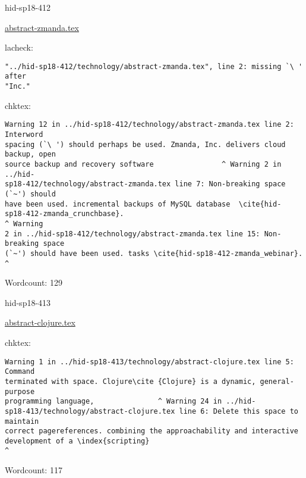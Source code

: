 

\begin{IU}

hid-sp18-412

\href{https://github.com/cloudmesh-community/hid-sp18-412/blob/master//technology/abstract-zmanda.tex}{abstract-zmanda.tex}

 
lacheck:
\begin{tiny}
\begin{verbatim}
"../hid-sp18-412/technology/abstract-zmanda.tex", line 2: missing `\ ' after
"Inc."
\end{verbatim}
\end{tiny}
chktex:
\begin{tiny}
\begin{verbatim}
Warning 12 in ../hid-sp18-412/technology/abstract-zmanda.tex line 2: Interword
spacing (`\ ') should perhaps be used. Zmanda, Inc. delivers cloud backup, open
source backup and recovery software                ^ Warning 2 in ../hid-
sp18-412/technology/abstract-zmanda.tex line 7: Non-breaking space (`~') should
have been used. incremental backups of MySQL database  \cite{hid-
sp18-412-zmanda_crunchbase}.                                          ^ Warning
2 in ../hid-sp18-412/technology/abstract-zmanda.tex line 15: Non-breaking space
(`~') should have been used. tasks \cite{hid-sp18-412-zmanda_webinar}.        ^
\end{verbatim}
\end{tiny}

Wordcount: 129

\end{IU}



\begin{IU}

hid-sp18-413

\href{https://github.com/cloudmesh-community/hid-sp18-413/blob/master//technology/abstract-clojure.tex}{abstract-clojure.tex}

 
chktex:
\begin{tiny}
\begin{verbatim}
Warning 1 in ../hid-sp18-413/technology/abstract-clojure.tex line 5: Command
terminated with space. Clojure\cite {Clojure} is a dynamic, general-purpose
programming language,               ^ Warning 24 in ../hid-
sp18-413/technology/abstract-clojure.tex line 6: Delete this space to maintain
correct pagereferences. combining the approachability and interactive
development of a \index{scripting}
^
\end{verbatim}
\end{tiny}

Wordcount: 117

\end{IU}

